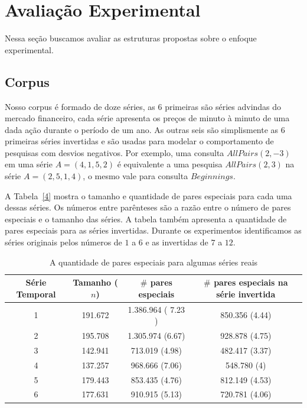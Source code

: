 \documentclass[12pt]{article}
\begin{document}
\section{Avaliação Experimental}

Nessa seção buscamos avaliar as estruturas propostas sobre o enfoque experimental.


\subsection{Corpus}

Nosso corpus é formado de doze séries, as 6 primeiras são séries advindas do mercado financeiro, 
cada série apresenta os preços de minuto à minuto de uma dada ação durante o período de um ano. 
As outras seis são simplismente as 6 primeiras séries invertidas e são usadas para modelar
o comportamento de pesquisas com desvios negativos. Por exemplo, uma consulta $AllPairs(2, -3)$
em uma série $A=(4, 1, 5, 2)$ é equivalente a uma pesquisa $AllPairs(2, 3)$ na série $A=(2, 5, 1, 4)$,
o mesmo vale para consulta $Beginnings$.

A Tabela~\ref{4} mostra o tamanho e quantidade de pares especiais para cada uma dessas séries.
Os números entre parênteses são a razão entre o número de pares especiais e o tamanho das séries.
A tabela também apresenta a quantidade de pares especiais para as séries invertidas. Durante
os experimentos identificamos as séries originais pelos números de $1$ a $6$ e as invertidas
de $7$ a $12$.
 
\begin{table}
\small
\begin{center}
\begin{tabular}{|c|c|c|c|}
\hline
 {\bf Série Temporal}  & {\bf Tamanho} ($n$) & {\bf $\#$ pares especiais} & {\bf $\# $ pares especiais na série invertida} \\ 
\hline
 1 & 191.672   & 1.386.964 ( 7.23 ) &  850.356 (4.44) \\
\hline
 2 & 195.708 & 1.305.974  (6.67) & 928.878 (4.75)\\
\hline
 3 & 142.941 &   713.019 (4.98) & 482.417  (3.37) \\
\hline
 4 & 137.257 &  968.666  (7.06) &  548.780 (4)\\
\hline
 5 & 179.443 & 853.435 (4.76) &  812.149 (4.53) \\
\hline
6  &  177.631 &  910.915 (5.13) &  720.781  (4.06) \\ \hline
\end{tabular}
\end{center}
\label{tab:Special-pairs}
\caption{A quantidade de pares especiais para algumas séries reais}
\normalsize
\end{table}
\end{document}
